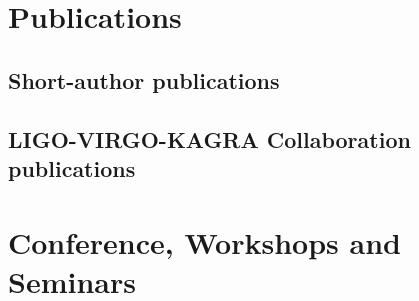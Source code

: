 \documentclass[10pt]{article}
\begin{document}
\section*{Publications}
\subsection*{Short-author publications}
\label{Short-author_publications}

\subsection*{LIGO-VIRGO-KAGRA Collaboration publications}
\label{LIGO-VIRGO-KAGRA_Collaboration_publications}



\section*{Conference, Workshops and Seminars}
\end{document}
